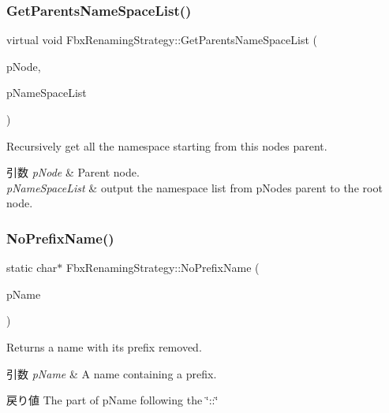 \subsubsection{\texorpdfstring{Get\+Parents\+Name\+Space\+List()}{GetParentsNameSpaceList()}}
{\footnotesize\ttfamily virtual void Fbx\+Renaming\+Strategy\+::\+Get\+Parents\+Name\+Space\+List (\begin{DoxyParamCaption}\item[{\hyperlink{class_fbx_node}{Fbx\+Node} $\ast$}]{p\+Node,  }\item[{\hyperlink{class_fbx_array}{Fbx\+Array}$<$ \hyperlink{class_fbx_string}{Fbx\+String} $\ast$$>$ \&}]{p\+Name\+Space\+List }\end{DoxyParamCaption})\hspace{0.3cm}{\ttfamily [virtual]}}

Recursively get all the namespace starting from this node\textquotesingle{}s parent. 
\begin{DoxyParams}{引数}
{\em p\+Node} & Parent node. \\
\hline
{\em p\+Name\+Space\+List} & output the namespace list from p\+Node\textquotesingle{}s parent to the root node. \\
\hline
\end{DoxyParams}
\mbox{\label{class_fbx_renaming_strategy_a74785822c27882421fe5e827c3347786}} 
\subsubsection{\texorpdfstring{No\+Prefix\+Name()}{NoPrefixName()}\hspace{0.1cm}{\footnotesize\ttfamily [1/2]}}
{\footnotesize\ttfamily static char$\ast$ Fbx\+Renaming\+Strategy\+::\+No\+Prefix\+Name (\begin{DoxyParamCaption}\item[{const char $\ast$}]{p\+Name }\end{DoxyParamCaption})\hspace{0.3cm}{\ttfamily [static]}}

Returns a name with its prefix removed. 
\begin{DoxyParams}{引数}
{\em p\+Name} & A name containing a prefix. \\
\hline
\end{DoxyParams}
\begin{DoxyReturn}{戻り値}
The part of p\+Name following the \char`\"{}\+::\char`\"{} 
\end{DoxyReturn}
\mbox{\label{class_fbx_renaming_strategy_a82d239d3b92ac672fd6ea71617a5c8e1}} 
